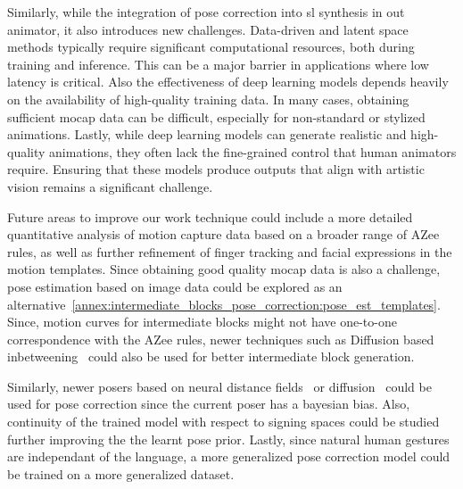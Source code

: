 \documentclass[../../main.tex]{subfiles}
\begin{document}
Similarly, while the integration of pose correction into \gls{sl} synthesis in out animator, it also introduces new challenges. Data-driven and latent space methods typically require significant computational resources, both during training and inference. This can be a major barrier in applications where low latency is critical. Also the effectiveness of deep learning models depends heavily on the availability of high-quality training data. In many cases, obtaining sufficient \gls{mocap} data can be difficult, especially for non-standard or stylized animations. Lastly, while deep learning models can generate realistic and high-quality animations, they often lack the fine-grained control that human animators require. Ensuring that these models produce outputs that align with artistic vision remains a significant challenge.

Future areas to improve our work technique could include a more detailed quantitative analysis of motion capture data based on a broader range of AZee rules, as well as further refinement of finger tracking and facial expressions in the motion templates. Since obtaining good quality \gls{mocap} data is also a challenge, pose estimation based on image data could be explored as an alternative~\ref{annex:intermediate_blocks_pose_correction:pose_est_templates}. Since, motion curves for intermediate blocks might not have one-to-one correspondence with the AZee rules, newer techniques such as Diffusion based inbetweening~\cite{cohan2024flexible} could also be used for better intermediate block generation. 

Similarly, newer posers based on neural distance fields~\cite{tiwari2022pose} or diffusion~\cite{lu2023dposer} could be used for pose correction since the current poser has a bayesian bias. Also, continuity of the trained model with respect to signing spaces could be studied further improving the the learnt pose prior. Lastly, since natural human gestures are independant of the language, a more generalized pose correction model could be trained on a more generalized dataset.
\end{document}
